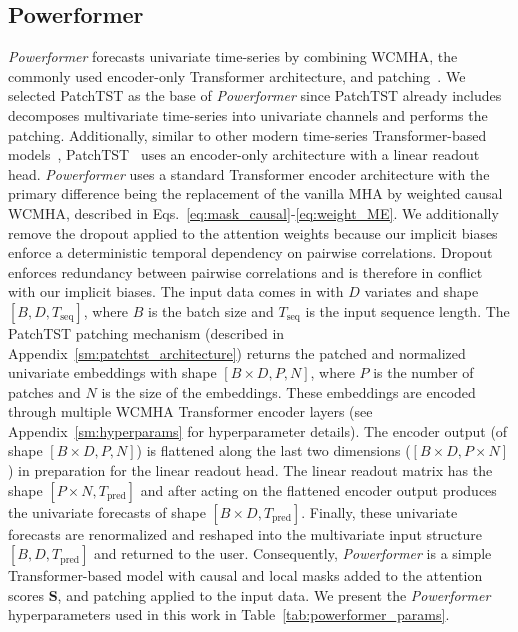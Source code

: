 \subsection{Powerformer}
\label{sm:powerformer_architecture}
\emph{Powerformer} forecasts univariate time-series by combining WCMHA, the commonly used encoder-only Transformer architecture, and patching~\cite{nie.patchtst.2023a}.
We selected PatchTST as the base of \emph{Powerformer} since PatchTST already includes decomposes multivariate time-series into univariate channels and performs the patching.
Additionally, similar to other modern time-series Transformer-based models~\cite{zhou2023OFA, liu2024itransformer, talukder2024totem}, PatchTST~\cite{nie.patchtst.2023a} uses an encoder-only architecture with a linear readout head.
\emph{Powerformer} uses a standard Transformer encoder architecture with the primary difference being the replacement of the vanilla MHA by weighted causal WCMHA, described in Eqs.~\ref{eq:mask_causal}-\ref{eq:weight_ME}.
We additionally remove the dropout applied to the attention weights because our implicit biases enforce a deterministic temporal dependency on pairwise correlations.
Dropout enforces redundancy between pairwise correlations and is therefore in conflict with our implicit biases.
The input data comes in with $D$ variates and shape $[B, D, T_\text{seq}]$, where $B$ is the batch size and $T_\text{seq}$ is the input sequence length.
The PatchTST patching mechanism (described in Appendix~\ref{sm:patchtst_architecture}) returns the patched and normalized univariate embeddings with shape $[B \times D, P, N]$, where $P$ is the number of patches and $N$ is the size of the embeddings.
These embeddings are encoded through multiple WCMHA Transformer encoder layers (see Appendix~\ref{sm:hyperparams} for hyperparameter details).
The encoder output (of shape $[B \times D, P, N]$) is flattened along the last two dimensions ($[B \times D, P \times N]$) in preparation for the linear readout head.
The linear readout matrix has the shape $[P \times N, T_\text{pred}]$ and after acting on the flattened encoder output produces the univariate forecasts of shape $[B \times D, T_\text{pred}]$.
Finally, these univariate forecasts are renormalized and reshaped into the multivariate input structure $[B, D, T_\text{pred}]$ and returned to the user.
Consequently, \emph{Powerformer} is a simple Transformer-based model with causal and local masks added to the attention scores $\mathbf{S}$, and patching applied to the input data.
We present the \emph{Powerformer} hyperparameters used in this work in Table~\ref{tab:powerformer_params}.


